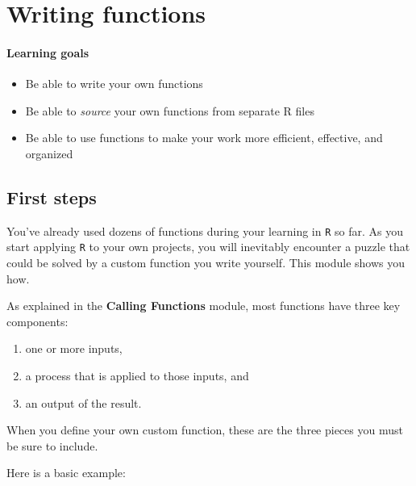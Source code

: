 \documentclass[
]{book}
\providecommand{\tightlist}{%
  \setlength{\itemsep}{0pt}\setlength{\parskip}{0pt}}
\begin{document}
\hypertarget{writing-functions}{%
\chapter{Writing functions}\label{writing-functions}}

\hypertarget{learning-goals-15}{%
\subsubsection*{Learning goals}\label{learning-goals-15}}

\begin{itemize}
\tightlist
\item
  Be able to write your own functions
\item
  Be able to \emph{source} your own functions from separate R files
\item
  Be able to use functions to make your work more efficient, effective, and organized
\end{itemize}

\hypertarget{first-steps}{%
\section*{First steps}\label{first-steps}}

You've already used dozens of functions during your learning in \texttt{R} so far. As you start applying \texttt{R} to your own projects, you will inevitably encounter a puzzle that could be solved by a custom function you write yourself. This module shows you how.

As explained in the \textbf{Calling Functions} module, most functions have three key components:

\begin{enumerate}
\def\labelenumi{(\arabic{enumi})}
\tightlist
\item
  one or more inputs,\\
\item
  a process that is applied to those inputs, and\\
\item
  an output of the result.
\end{enumerate}

When you define your own custom function, these are the three pieces you must be sure to include.

Here is a basic example:
\end{document}
